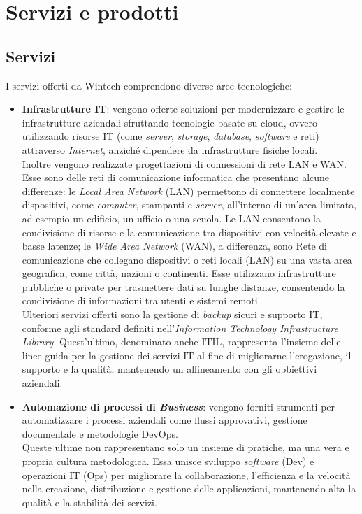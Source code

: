 \section{Servizi e prodotti}
\subsection{Servizi}
I servizi offerti da Wintech comprendono diverse aree tecnologiche:
\begin{itemize}
	\item \textbf{Infrastrutture IT}: vengono offerte soluzioni per modernizzare e gestire le infrastrutture aziendali sfruttando tecnologie basate su \gls{cloud}, ovvero utilizzando risorse IT (come \emph{server}, \emph{storage}, \emph{database}, \emph{software} e reti) attraverso \emph{Internet}, anziché dipendere da infrastrutture fisiche locali.\\
    Inoltre vengono realizzate progettazioni di connessioni di rete LAN e WAN. Esse sono delle reti di comunicazione informatica che presentano alcune differenze: le \emph{Local Area Network} (LAN) permettono di connettere localmente dispositivi, come
    \emph{computer}, stampanti e \emph{server}, all'interno di un'area limitata, ad esempio un edificio, un ufficio o una scuola. Le LAN consentono la condivisione di risorse e la comunicazione tra dispositivi con velocità elevate e basse latenze; 
    le \emph{Wide Area Network} (WAN), a differenza, sono Rete di comunicazione che collegano dispositivi o reti locali (LAN) su una vasta area geografica, come città, nazioni o continenti. Esse utilizzano infrastrutture pubbliche o private per trasmettere dati su lunghe distanze, consentendo la condivisione di informazioni tra utenti e sistemi remoti.\\
    Ulteriori servizi offerti sono la gestione di \emph{backup} sicuri e supporto \gls{IT}, conforme agli standard definiti nell'\emph{Information Technology Infrastructure Library}. Quest'ultimo, denominato anche ITIL, rappresenta l'insieme delle linee guida per la gestione dei servizi IT al fine di migliorarne l'erogazione, il supporto e la qualità, mantenendo un allineamento con gli obbiettivi aziendali.\\ 
	\item \textbf{Automazione di processi di \emph{Business}}: vengono forniti strumenti per automatizzare i processi aziendali come flussi approvativi, gestione documentale e metodologie \gls{DevOps}.\\
    Queste ultime non rappresentano solo un insieme di pratiche, ma una vera e propria cultura metodologica. Essa unisce sviluppo \emph{software} (Dev) e operazioni \gls{IT} (Ops) per migliorare la collaborazione, l'efficienza e la velocità nella creazione, distribuzione e gestione delle applicazioni, mantenendo alta la qualità e la stabilità dei servizi.

\end{itemize}
